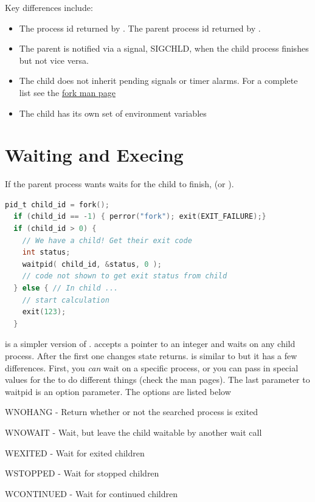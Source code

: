 Key differences include: 
\begin{itemize}
\item The process id returned by . The parent process id returned by . 
\item The parent is notified via a signal, SIGCHLD, when the child process finishes but not vice versa. 
\item The child does not inherit pending signals or timer alarms. For a complete list see the \href{http://man7.org/linux/man-pages/man2/fork.2.html}{fork man page}
\item The child has its own set of environment variables
\end{itemize}

\section{Waiting and Execing}

If the parent process wants waits for the child to finish,  (or ).

\begin{lstlisting}[language=C]
  pid_t child_id = fork();
  if (child_id == -1) { perror("fork"); exit(EXIT_FAILURE);}
  if (child_id > 0) { 
    // We have a child! Get their exit code
    int status; 
    waitpid( child_id, &status, 0 );
    // code not shown to get exit status from child
  } else { // In child ...
    // start calculation
    exit(123);
  }
\end{lstlisting}

 is a simpler version of .
 accepts a pointer to an integer and waits on any child process.
After the first one changes state  returns.
 is similar to  but it has a few differences.
First, you \textit{can} wait on a specific process, or you can pass in special values for the  to do different things (check the man pages).
The last parameter to waitpid is an option parameter. The options are listed below


\begin{enunmerate}
\item WNOHANG - Return whether or not the searched process is exited
\item WNOWAIT - Wait, but leave the child waitable by another wait call
\item WEXITED - Wait for exited children
\item WSTOPPED - Wait for stopped children
\item WCONTINUED - Wait for continued children
\end{enunmerate}

